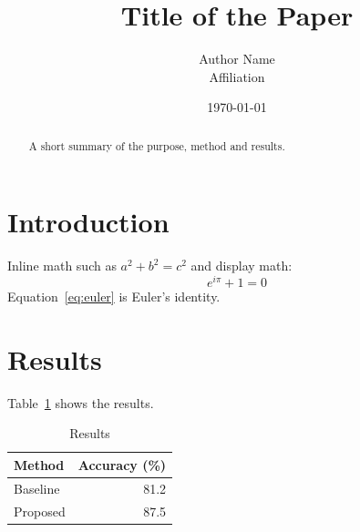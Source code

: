 \documentclass[11pt,a4paper]{article}
\title{Title of the Paper}
\author{Author Name\\ Affiliation}
\date{\today}
\begin{document}
\maketitle

\begin{abstract}
A short summary of the purpose, method and results.
\end{abstract}

\section{Introduction}\label{sec:intro}
Inline math such as $a^2 + b^2 = c^2$ and display math:
\begin{equation}\label{eq:euler}
  e^{i\pi} + 1 = 0
\end{equation}
Equation~\eqref{eq:euler} is Euler's identity.

\section{Results}
Table~\ref{tab:result} shows the results.
\begin{table}[h]
  \centering
  \caption{Results}\label{tab:result}
  \begin{tabular}{lr}
    \toprule
    Method & Accuracy (\%) \\
    \midrule
    Baseline & 81.2 \\
    Proposed & 87.5 \\
    \bottomrule
  \end{tabular}
\end{table}
\end{document}
